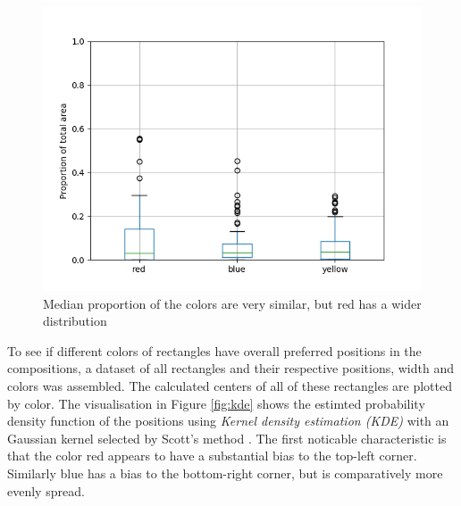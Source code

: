 \documentclass[serif,article,noparskip]{agse-thesis}
\begin{document}
\begin{figure} \includegraphics[width=\linewidth]{images/colors-rby.png}
\caption{Median proportion of the colors are very similar, but red has a
wider distribution} \label{fig:colors-rby} \end{figure}

To see if different colors of rectangles have overall preferred positions in the
compositions, a dataset of all rectangles and their respective positions, width
and colors was assembled. The calculated centers of all of these rectangles are
plotted by color. The visualisation in Figure \ref{fig:kde} shows the estimted
probability density function of the positions using \textit{Kernel density
estimation (KDE)} with an Gaussian kernel selected by Scott's method
\cite{Terrell1992}. The first noticable characteristic is that the color red
appears to have a substantial bias to the top-left corner. Similarly blue has a
bias to the bottom-right corner, but is comparatively more evenly spread.
\end{document}
